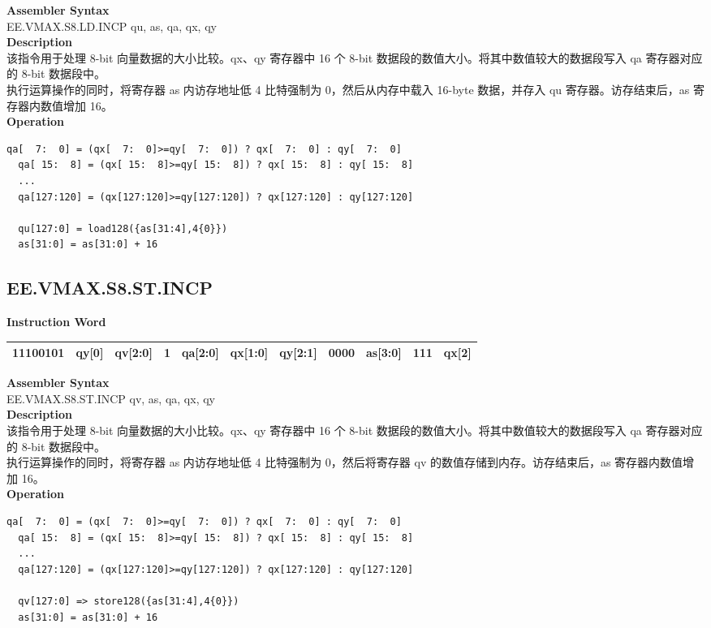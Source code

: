 \textbf{Assembler Syntax} \\
EE.VMAX.S8.LD.INCP qu, as, qa, qx, qy \\
\textbf{Description} \\
该指令用于处理 8-bit 向量数据的大小比较。qx、qy 寄存器中 16 个 8-bit 数据段的数值大小。将其中数值较大的数据段写入 qa 寄存器对应的 8-bit 数据段中。\\
执行运算操作的同时，将寄存器 as 内访存地址低 4 比特强制为 0，然后从内存中载入 16-byte 数据，并存入 qu 寄存器。访存结束后，as 寄存器内数值增加 16。\\
\textbf{Operation}
\begin{lstlisting}[escapeinside=`?]
  qa[  7:  0] = (qx[  7:  0]>=qy[  7:  0]) ? qx[  7:  0] : qy[  7:  0]
  qa[ 15:  8] = (qx[ 15:  8]>=qy[ 15:  8]) ? qx[ 15:  8] : qy[ 15:  8]
  ...
  qa[127:120] = (qx[127:120]>=qy[127:120]) ? qx[127:120] : qy[127:120]

  qu[127:0] = load128({as[31:4],4{0}})
  as[31:0] = as[31:0] + 16
\end{lstlisting}

\clearpage
\subsection{EE.VMAX.S8.ST.INCP}\label{instruction:EEVMAXS8STINCP}
\setlength\tabcolsep{6pt}
\textbf{Instruction Word} \\
\begin{tabular}{|c|c|c|c|c|c|c|c|c|c|c|}
	\hline
	11100101 & qy[0] & qv[2:0] & 1 & qa[2:0] & qx[1:0] & qy[2:1] & 0000 & as[3:0] & 111 & qx[2] \\
	\hline
\end{tabular}

\textbf{Assembler Syntax} \\
EE.VMAX.S8.ST.INCP qv, as, qa, qx, qy \\
\textbf{Description} \\
该指令用于处理 8-bit 向量数据的大小比较。qx、qy 寄存器中 16 个 8-bit 数据段的数值大小。将其中数值较大的数据段写入 qa 寄存器对应的 8-bit 数据段中。\\
执行运算操作的同时，将寄存器 as 内访存地址低 4 比特强制为 0，然后将寄存器 qv 的数值存储到内存。访存结束后，as 寄存器内数值增加 16。\\
\textbf{Operation}
\begin{lstlisting}[escapeinside=`?]
  qa[  7:  0] = (qx[  7:  0]>=qy[  7:  0]) ? qx[  7:  0] : qy[  7:  0]
  qa[ 15:  8] = (qx[ 15:  8]>=qy[ 15:  8]) ? qx[ 15:  8] : qy[ 15:  8]
  ...
  qa[127:120] = (qx[127:120]>=qy[127:120]) ? qx[127:120] : qy[127:120]

  qv[127:0] => store128({as[31:4],4{0}})
  as[31:0] = as[31:0] + 16
\end{lstlisting}

